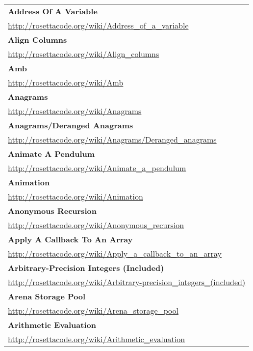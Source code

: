 \begin{longtable}{l}
\textbf{
Address Of A Variable } \\ \href{http://rosettacode.org/wiki/Address\_of\_a\_variable}{http://rosettacode.org/wiki/Address\_of\_a\_variable} \\
\textbf{Align Columns } \\ \href{http://rosettacode.org/wiki/Align\_columns}{http://rosettacode.org/wiki/Align\_columns} \\
\textbf{Amb } \\ \href{http://rosettacode.org/wiki/Amb}{http://rosettacode.org/wiki/Amb} \\
\textbf{Anagrams } \\ \href{http://rosettacode.org/wiki/Anagrams}{http://rosettacode.org/wiki/Anagrams} \\
\textbf{
Anagrams/Deranged Anagrams } \\ \href{http://rosettacode.org/wiki/Anagrams/Deranged\_anagrams}{http://rosettacode.org/wiki/Anagrams/Deranged\_anagrams} \\
\textbf{Animate A Pendulum } \\ \href{http://rosettacode.org/wiki/Animate\_a\_pendulum}{http://rosettacode.org/wiki/Animate\_a\_pendulum} \\
\textbf{Animation } \\ \href{http://rosettacode.org/wiki/Animation}{http://rosettacode.org/wiki/Animation} \\
\textbf{
Anonymous Recursion } \\ \href{http://rosettacode.org/wiki/Anonymous\_recursion}{http://rosettacode.org/wiki/Anonymous\_recursion} \\
\textbf{Apply A Callback To An Array } \\ \href{http://rosettacode.org/wiki/Apply\_a\_callback\_to\_an\_array}{http://rosettacode.org/wiki/Apply\_a\_callback\_to\_an\_array} \\
\textbf{
Arbitrary-Precision Integers (Included) } \\ \href{http://rosettacode.org/wiki/Arbitrary-precision\_integers\_(included)}{http://rosettacode.org/wiki/Arbitrary-precision\_integers\_(included)} \\
\textbf{Arena Storage Pool } \\ \href{http://rosettacode.org/wiki/Arena\_storage\_pool}{http://rosettacode.org/wiki/Arena\_storage\_pool} \\
\textbf{
Arithmetic Evaluation } \\ \href{http://rosettacode.org/wiki/Arithmetic\_evaluation}{http://rosettacode.org/wiki/Arithmetic\_evaluation} \\

\end{longtable}
